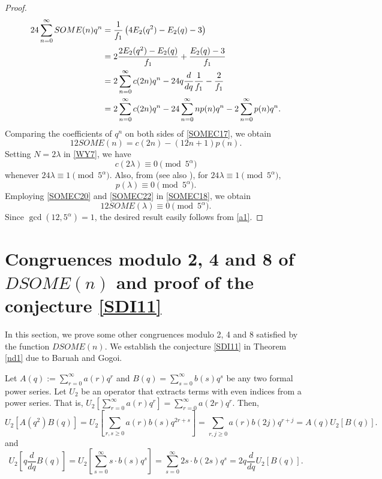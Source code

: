 \documentclass[12pt]{article}
\numberwithin{equation}{section}
\theoremstyle{definition}
\theoremstyle{remark}
\numberwithin{equation}{section}
\begin{document}
\begin{proof}
\begin{align}
24\sum_{n=0}^{\infty}SOME(n)q^n
&=\dfrac{1}{f_1}\left(4E_2(q^2)-E_2(q)-3\right) \notag\\
&=2\dfrac{2E_2(q^2)-E_2(q)}{f_1}
+\dfrac{E_2(q)-3}{f_1} \notag\\
&=2\sum_{n=0}^{\infty}c(2n)q^n
-24q\dfrac{d}{dq}\dfrac{1}{f_1}-\dfrac{2}{f_1}\notag\\
&\label{SOMEC17}=2\sum_{n=0}^{\infty}c(2n)q^n-24\sum_{n=0}^{\infty}np(n)q^n-2\sum_{n=0}^{\infty}p(n)q^n.
\end{align}
Comparing the coefficients of $q^n$ on both sides of \eqref{SOMEC17},
we obtain
\begin{equation}\label{SOMEC18}
12SOME(n)=c(2n)-(12n+1)p(n).
\end{equation}
Setting $N=2\lambda$ in \eqref{WY7}, we have
\begin{equation}\label{SOMEC20}
c(2\lambda)\equiv0\pmod{5^\alpha}
\end{equation}whenever $24\lambda\equiv1\pmod{5^\alpha}$.
Also, from \cite{R} (see also \cite{Wat}), for $24\lambda\equiv1\pmod{5^\alpha}$,
\begin{equation}\label{SOMEC22}
p(\lambda)\equiv0\pmod{5^\alpha}.
\end{equation} 
Employing \eqref{SOMEC20} and \eqref{SOMEC22} in \eqref{SOMEC18}, we obtain
\begin{equation}\label{a1}
12SOME(\lambda)\equiv0\pmod{5^\alpha}.\end{equation}
Since $\gcd(12,5^\alpha)=1$, the desired result easily follows from \eqref{a1}.
\end{proof}


\section{Congruences modulo 2, 4 and 8 of $DSOME(n)$ and proof of the conjecture \eqref{SDI11} }
 In this section, we  prove some other congruences modulo 2, 4 and 8 satisfied by the function $DSOME(n)$. We establish  the conjecture \eqref{SDI11} in Theorem \ref{nd1} due to Baruah and Gogoi.  

Let  $A(q):=\sum_{r=0}^{\infty}a(r)q^r$ and $B(q)=\sum_{s=0}^{\infty}b(s)q^s$ be any two formal power series. Let $U_2$ be an operator that extracts terms with even indices from a power series. That is,   $U_2[\sum_{r=0}^{\infty}a(r)q^r]=\sum_{r=0}^{\infty}a(2r)q^r$. Then, 
\begin{equation}\label{DSE16}
U_2\left[A(q^2)B(q)\right]
=
U_2\left[
\sum_{r,s\geq0}a(r)b(s)q^{2r+s}
\right]
=
\sum_{r,j\geq0}a(r)b(2j)q^{r+j}
=
A(q)U_2\left[B(q)\right].
\end{equation}
and 
\begin{equation}\label{DSE17}
U_2\left[q\dfrac{d}{dq}B(q)\right]
=
U_2\left[
\sum_{s=0}^{\infty}s\cdot b(s)q^s
\right]
=
\sum_{s=0}^{\infty}2s\cdot b(2s)q^s
=
2q\dfrac{d}{dq} U_2\left[B(q)\right].
\end{equation}
\end{document}
